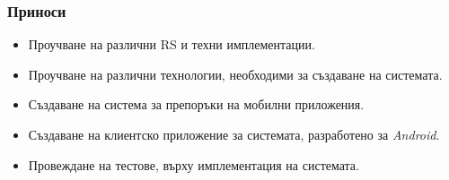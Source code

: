 \subsubsection{Приноси}
	
	\begin{itemize}
		\item Проучване на различни \ac{RS} и техни имплементации.
		\item Проучване на различни технологии, необходими за създаване на системата.
		\item Създаване на система за препоръки на мобилни приложения.
		\item Създаване на клиентско приложение за системата, разработено за \emph{Android}.
		\item Провеждане на тестове, върху имплементация на системата.
	\end{itemize}